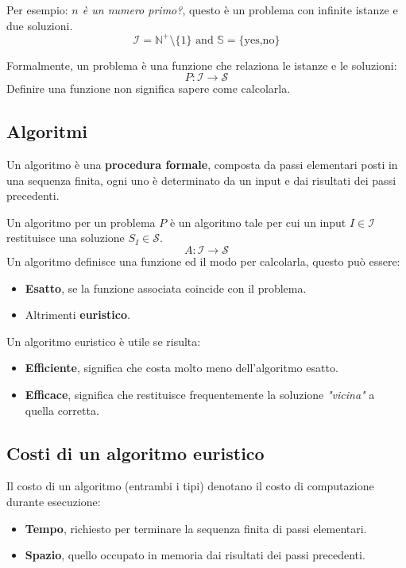 \documentclass{article}
\begin{document}
Per esempio: \textit{$n$ è un numero primo?}, questo è un problema con infinite istanze e due soluzioni.
$$\mathcal{I}=\mathbb{N}^+\setminus{\{1\}}\text{ and }\mathbb{S}=\text{\{yes,no\}}$$

Formalmente, un problema è una funzione che relaziona le istanze e le soluzioni:
$$P:\mathcal{I}\rightarrow\mathcal{S}$$
Definire una funzione non significa sapere come calcolarla.

\subsection{Algoritmi}
Un algoritmo è una \textbf{procedura formale}, composta da passi elementari posti in una sequenza finita, ogni
uno è determinato da un input e dai risultati dei passi precedenti.

Un algoritmo per un problema $P$ è un algoritmo tale per cui un input $I\in\mathcal{I}$ restituisce una soluzione
$S_I\in\mathcal{S}$.
$$A:\mathcal{I}\rightarrow\mathcal{S}$$
Un algoritmo definisce una funzione ed il modo per calcolarla, questo può essere:
\begin{itemize}
    \item \textbf{Esatto}, se la funzione associata coincide con il problema.
    \item Altrimenti \textbf{euristico}.
\end{itemize}
Un algoritmo euristico è utile se risulta:
\begin{itemize}
    \item \textbf{Efficiente}, significa che costa molto meno dell'algoritmo esatto.
    \item \textbf{Efficace}, significa che restituisce frequentemente la soluzione \textit{"vicina"} a quella corretta.
\end{itemize}

\subsection{Costi di un algoritmo euristico}
Il costo di un algoritmo (entrambi i tipi) denotano il costo di computazione durante esecuzione:

\begin{itemize}
    \item \textbf{Tempo}, richiesto per terminare la sequenza finita di passi elementari.
    \item \textbf{Spazio}, quello occupato in memoria dai risultati dei passi precedenti.
\end{itemize}
\end{document}
